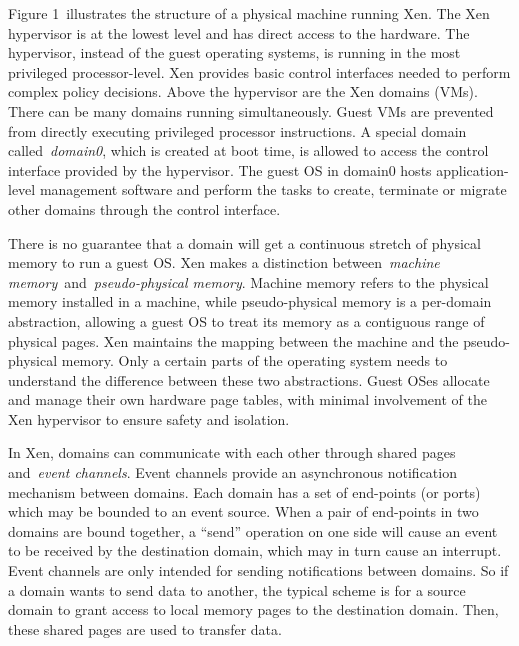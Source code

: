 \documentclass[12pt]{article}
\begin{document}

\setlength{\parskip}{0.0pt}
{\fontsize{13pt}{15.6pt}\selectfont Figure 1 illustrates the structure of a physical machine running Xen. The Xen hypervisor is at the lowest level and has direct access to the hardware. The hypervisor, instead of the guest operating systems, is running in the most privileged processor-level. Xen provides basic control interfaces needed to perform complex policy decisions. Above the hypervisor are the Xen domains (VMs). There can be many domains running simultaneously. Guest VMs are prevented from directly executing privileged processor instructions. A special domain called \textit{domain0}, which is created at boot time, is allowed to access the control interface provided by the hypervisor. The guest OS in domain0 hosts application-level management software and perform the tasks to create, terminate or migrate other domains through the control interface.\par}\par

\setlength{\parskip}{5.04pt}
{\fontsize{13pt}{15.6pt}\selectfont There is no guarantee that a domain will get a continuous stretch of physical memory to run a guest OS. Xen makes a distinction between \textit{machine memory} and \textit{pseudo-physical memory}. Machine memory refers to the physical memory installed in a machine, while pseudo-physical memory is a per-domain abstraction, allowing a guest OS to treat its memory as a contiguous range of physical pages. Xen maintains the mapping between the machine and the pseudo-physical memory. Only a certain parts of the operating system needs to understand the difference between these two abstractions. Guest OSes allocate and manage their own hardware page tables, with minimal involvement of the Xen hypervisor to ensure safety and isolation.\par}\par

{\fontsize{13pt}{15.6pt}\selectfont In Xen, domains can communicate with each other through shared pages and \textit{event channels}. Event channels provide an asynchronous notification mechanism between domains. Each domain has a set of end-points (or ports) which may be bounded to an event source. When a pair of end-points in two domains are bound together, a ``send'' operation on one side will cause an event to be received by the destination domain, which may in turn cause an interrupt. Event channels are only intended for sending notifications between domains. So if a domain wants to send data to another, the typical scheme is for a source domain to grant access to local memory pages to the destination domain. Then, these shared pages are used to transfer data.\par}\par
\end{document}
